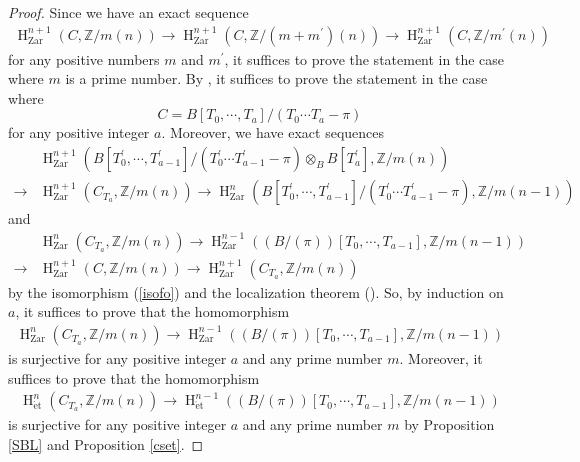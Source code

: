 \documentclass{article}
\newcommand{\et}{\mathrm{\acute{e}t}}
\newcommand{\Zar}{\mathrm{Zar}}
\newcommand{\HO}{\operatorname{H}}
\begin{document}
%
\begin{proof}\upshape
Since we have an exact sequence
%
\begin{align*}
\HO^{n+1}_{\Zar}(
C, \mathbb{Z}/m(n)
)    
\to
\HO^{n+1}_{\Zar}(
C, \mathbb{Z}/(m+m^{\prime})(n)
)    
\to
\HO^{n+1}_{\Zar}(
C, \mathbb{Z}/m^{\prime}(n)
)    
\end{align*}
%
for any positive numbers $m$ and $m^{\prime}$,
it suffices to prove the statement in the case where
$m$ is a prime number. By \cite[p.781, Corollary 3.5]{Ge}, 
it suffices to prove the statement
in the case where
%
\begin{equation*}
C=
B[T_{0}, \cdots, T_{a}]/
(T_{0}\cdots T_{a}-\pi)
\end{equation*}
%
for any positive integer $a$. Moreover, we have exact sequences
%
\begin{align*}
&\HO^{n+1}_{\Zar}(
B[T_{0}^{\prime}, \cdots, T_{a-1}^{\prime}]/(T_{0}^{\prime}\cdots T_{a-1}^{\prime}-\pi)\otimes_{B}B[T_{a}^{\prime}],
\mathbb{Z}/m(n)
)  \\   
\to
&\HO^{n+1}_{\Zar}(
C_{T_{a}}, \mathbb{Z}/m(n)
)
\to
\HO^{n}_{\Zar}(
B[T_{0}^{\prime}, \cdots, T_{a-1}^{\prime}]/(T_{0}^{\prime}\cdots T_{a-1}^{\prime}-\pi),
\mathbb{Z}/m(n-1)
)
\end{align*}
%
and
%
\begin{align*}
&\HO^{n}_{\Zar}(
C_{T_{a}}, \mathbb{Z}/m(n)
)    
\to
\HO^{n-1}_{\Zar}\left(
(B/(\pi))[T_{0}, \cdots, T_{a-1}],
\mathbb{Z}/m(n-1)
\right)  \\
\to
&\HO^{n+1}_{\Zar}(
C, \mathbb{Z}/m(n)
)
\to
\HO^{n+1}_{\Zar}(
C_{T_{a}},
\mathbb{Z}/m(n)
)
\end{align*}
%
by the isomorphism (\ref{isofo}) and the localization theorem (\cite[p.779, Theorem 3.2]{Ge}). 
So, by induction on $a$, 
it suffices to prove that the
homomorphism
%
\begin{align*}
\HO^{n}_{\Zar}(
C_{T_{a}}, \mathbb{Z}/m(n)
)    
\to
\HO^{n-1}_{\Zar}\left(
(B/(\pi))[T_{0}, \cdots, T_{a-1}],
\mathbb{Z}/m(n-1)
\right) 
\end{align*}
%
is surjective for any positive integer $a$ and any prime number $m$.
Moreover, it suffices to prove that the
homomorphism
%
\begin{align}\label{connm}
\HO^{n}_{\et}(
C_{T_{a}}, \mathbb{Z}/m(n)
)    
\to
\HO^{n-1}_{\et}\left(
(B/(\pi))[T_{0}, \cdots, T_{a-1}],
\mathbb{Z}/m(n-1)
\right) 
\end{align}
%
is surjective for any positive integer $a$ and any prime number $m$
by Proposition \ref{SBL} and Proposition \ref{cset}.


\end{proof}
\end{document}
